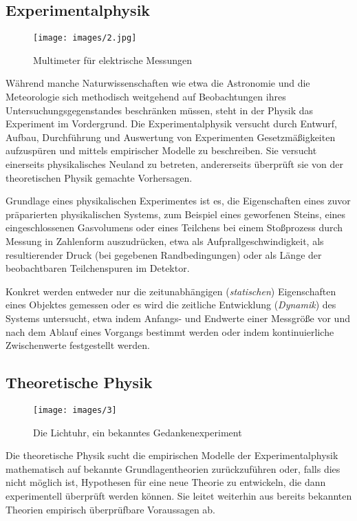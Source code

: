 \documentclass[titlepage, parkskip=full, twocolumn, landscape]{scrartcl}
\begin{document}
\subsection{Experimentalphysik}

\begin{figure}
	\centering
	\texttt{[image: images/2.jpg]}
	\caption{Multimeter für elektrische Messungen}
\end{figure}

Während manche Naturwissenschaften wie etwa die Astronomie und die Meteorologie sich methodisch weitgehend auf Beobachtungen ihres Untersuchungsgegenstandes beschränken müssen, steht in der Physik das Experiment im Vordergrund. Die Experimentalphysik versucht durch Entwurf, Aufbau, Durchführung und Auswertung von Experimenten Gesetzmäßigkeiten aufzuspüren und mittels empirischer Modelle zu beschreiben. Sie versucht einerseits physikalisches Neuland zu betreten, andererseits überprüft sie von der theoretischen Physik gemachte Vorhersagen.

Grundlage eines physikalischen Experimentes ist es, die Eigenschaften eines zuvor präparierten physikalischen Systems, zum Beispiel eines geworfenen Steins, eines eingeschlossenen Gasvolumens oder eines Teilchens bei einem Stoßprozess durch Messung in Zahlenform auszudrücken, etwa als Aufprallgeschwindigkeit, als resultierender Druck (bei gegebenen Randbedingungen) oder als Länge der beobachtbaren Teilchenspuren im Detektor.

Konkret werden entweder nur die zeitunabhängigen (\emph{statischen}) Eigenschaften eines Objektes gemessen oder es wird die zeitliche Entwicklung (\emph{Dynamik}) des Systems untersucht, etwa indem Anfangs- und Endwerte einer Messgröße vor und nach dem Ablauf eines Vorgangs bestimmt werden oder indem kontinuierliche Zwischenwerte festgestellt werden.

\subsection{Theoretische Physik}

\begin{figure}
	\centering
	\texttt{[image: images/3]}
	\caption{Die Lichtuhr, ein bekanntes Gedankenexperiment}
\end{figure}

Die theoretische Physik sucht die empirischen Modelle der Experimentalphysik mathematisch auf bekannte Grundlagentheorien zurückzuführen oder, falls dies nicht möglich ist, Hypothesen für eine neue Theorie zu entwickeln, die dann experimentell überprüft werden können. Sie leitet weiterhin aus bereits bekannten Theorien empirisch überprüfbare Voraussagen ab.
\end{document}
